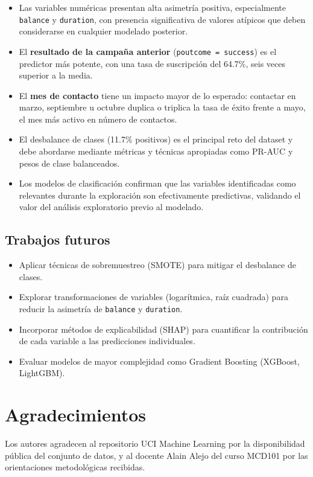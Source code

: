 \documentclass[conference]{IEEEtran}
\begin{document}
\begin{itemize}
    \item Las variables numéricas presentan alta asimetría positiva, especialmente \texttt{balance} y \texttt{duration}, con presencia significativa de valores atípicos que deben considerarse en cualquier modelado posterior.
    \item El \textbf{resultado de la campaña anterior} (\texttt{poutcome = success}) es el predictor más potente, con una tasa de suscripción del 64.7\%, seis veces superior a la media.
    \item El \textbf{mes de contacto} tiene un impacto mayor de lo esperado: contactar en marzo, septiembre u octubre duplica o triplica la tasa de éxito frente a mayo, el mes más activo en número de contactos.
    \item El desbalance de clases (11.7\% positivos) es el principal reto del dataset y debe abordarse mediante métricas y técnicas apropiadas como PR-AUC y pesos de clase balanceados.
    \item Los modelos de clasificación confirman que las variables identificadas como relevantes durante la exploración son efectivamente predictivas, validando el valor del análisis exploratorio previo al modelado.
\end{itemize}

\subsection{Trabajos futuros}

\begin{itemize}
    \item Aplicar técnicas de sobremuestreo (SMOTE) para mitigar el desbalance de clases.
    \item Explorar transformaciones de variables (logarítmica, raíz cuadrada) para reducir la asimetría de \texttt{balance} y \texttt{duration}.
    \item Incorporar métodos de explicabilidad (SHAP) para cuantificar la contribución de cada variable a las predicciones individuales.
    \item Evaluar modelos de mayor complejidad como Gradient Boosting (XGBoost, LightGBM).
\end{itemize}

\section*{Agradecimientos}
Los autores agradecen al repositorio UCI Machine Learning por la disponibilidad pública del conjunto de datos, y al docente Alain Alejo del curso MCD101 por las orientaciones metodológicas recibidas.
\end{document}
